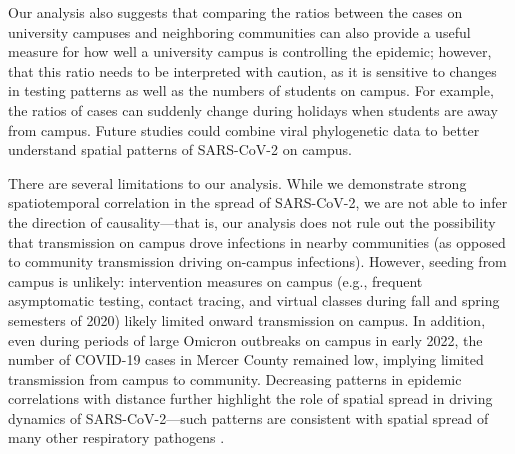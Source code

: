 \documentclass[12pt]{article}
\begin{document}
Our analysis also suggests that comparing the ratios between the cases on university campuses and neighboring communities can also provide a useful measure for how well a university campus is controlling the epidemic; 
however, that this ratio needs to be interpreted with caution, as it is sensitive to changes in testing patterns as well as the numbers of students on campus.
For example, the ratios of cases can suddenly change during holidays when students are away from campus.
Future studies could combine viral phylogenetic data to better understand spatial patterns of SARS-CoV-2 on campus.

There are several limitations to our analysis.
While we demonstrate strong spatiotemporal correlation in the spread of SARS-CoV-2, we are not able to infer the direction of causality---that is, our analysis does not rule out the possibility that transmission on campus drove infections in nearby communities (as opposed to community transmission driving on-campus infections).
However, seeding from campus is unlikely: 
intervention measures on campus (e.g., frequent asymptomatic testing, contact tracing, and virtual classes during fall and spring semesters of 2020) likely limited onward transmission on campus.
In addition, even during periods of large Omicron outbreaks on campus in early 2022, the number of COVID-19 cases in Mercer County remained low, implying limited transmission from campus to community.
Decreasing patterns in epidemic correlations with distance further highlight the role of spatial spread in driving dynamics of SARS-CoV-2---such patterns are consistent with spatial spread of many other respiratory pathogens \citep{grenfell2001travelling, viboud2006synchrony, baker2019epidemic}.
\end{document}
